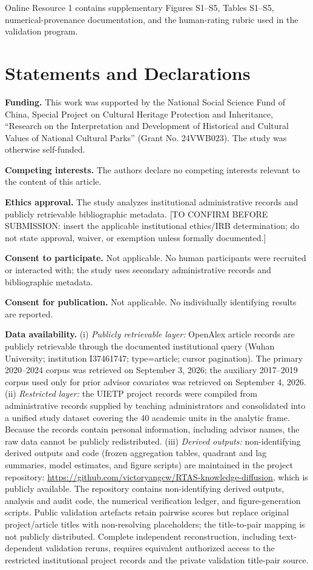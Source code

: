 \documentclass[pdflatex,sn-apa]{sn-jnl}
\begin{document}

Online Resource 1 contains supplementary Figures S1--S5, Tables S1--S5, numerical-provenance documentation, and the human-rating rubric used in the validation program.

\section*{Statements and Declarations}

\textbf{Funding.} This work was supported by the National Social Science Fund of China, Special Project on Cultural Heritage Protection and Inheritance, ``Research on the Interpretation and Development of Historical and Cultural Values of National Cultural Parks'' (Grant No. 24VWB023). The study was otherwise self-funded.

\textbf{Competing interests.} The authors declare no competing interests relevant to the content of this article.

\textbf{Ethics approval.} The study analyzes institutional administrative records and publicly retrievable bibliographic metadata. [TO CONFIRM BEFORE SUBMISSION: insert the applicable institutional ethics/IRB determination; do not state approval, waiver, or exemption unless formally documented.]

\textbf{Consent to participate.} Not applicable. No human participants were recruited or interacted with; the study uses secondary administrative records and bibliographic metadata.

\textbf{Consent for publication.} Not applicable. No individually identifying results are reported.

\textbf{Data availability.} (i) \emph{Publicly retrievable layer:} OpenAlex article records are publicly retrievable through the documented institutional query (Wuhan University; institution I37461747; type=article; cursor pagination). The primary 2020--2024 corpus was retrieved on September 3, 2026; the auxiliary 2017--2019 corpus used only for prior advisor covariates was retrieved on September 4, 2026. (ii) \emph{Restricted layer:} the UIETP project records were compiled from administrative records supplied by teaching administrators and consolidated into a unified study dataset covering the 40 academic units in the analytic frame. Because the records contain personal information, including advisor names, the raw data cannot be publicly redistributed. (iii) \emph{Derived outputs:} non-identifying derived outputs and code (frozen aggregation tables, quadrant and lag summaries, model estimates, and figure scripts) are maintained in the project repository:
\url{https://github.com/victoryangcw/RTAS-knowledge-diffusion}, which is publicly available. The repository contains non-identifying derived outputs, analysis and audit code, the numerical verification ledger, and figure-generation scripts. Public validation artefacts retain pairwise scores but replace original project/article titles with non-resolving placeholders; the title-to-pair mapping is not publicly distributed. Complete independent reconstruction, including text-dependent validation reruns, requires equivalent authorized access to the restricted institutional project records and the private validation title-pair source.
\end{document}
